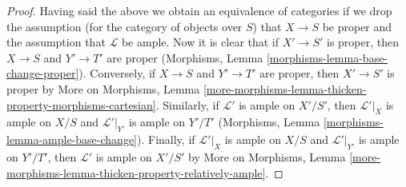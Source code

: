 \documentclass{stacks-project}
\theoremstyle{plain}
\theoremstyle{definition}
\theoremstyle{remark}
\numberwithin{equation}{subsection}
\begin{document}
\begin{proof}
\medskip\noindent
Having said the above we obtain an equivalence of categories if we drop
the assumption (for the category of objects over $S$) that $X \to S$ be proper
and the assumption that $\mathcal{L}$ be ample.
Now it is clear that if $X' \to S'$ is proper, then
$X \to S$ and $Y' \to T'$ are proper (Morphisms, Lemma
\ref{morphisms-lemma-base-change-proper}).
Conversely, if $X \to S$ and $Y' \to T'$ are proper, then
$X' \to S'$ is proper by
More on Morphisms, Lemma
\ref{more-morphisms-lemma-thicken-property-morphisms-cartesian}.
Similarly, if $\mathcal{L}'$ is ample on $X'/S'$, then
$\mathcal{L}'|_X$ is ample on $X/S$ and
$\mathcal{L}'|_{Y'}$ is ample on $Y'/T'$
(Morphisms, Lemma \ref{morphisms-lemma-ample-base-change}).
Finally, if $\mathcal{L}'|_X$ is ample on $X/S$ and
$\mathcal{L}'|_{Y'}$ is ample on $Y'/T'$, then
$\mathcal{L}'$ is ample on $X'/S'$ by
More on Morphisms, Lemma
\ref{more-morphisms-lemma-thicken-property-relatively-ample}.
\end{proof}
\end{document}
